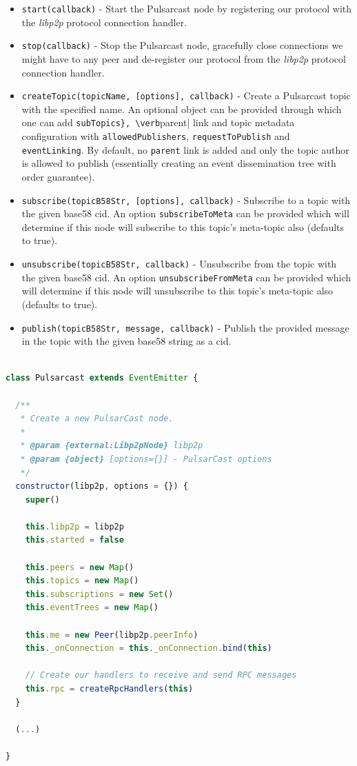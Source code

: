 \begin{itemize}
  \item
    \verb|start(callback)| -  Start the Pulsarcast node by registering our protocol with the \emph{libp2p} protocol connection handler.
  \item
    \verb|stop(callback)| - Stop the Pulsarcast node, gracefully close connections we might have to any peer and de-register our protocol from the \emph{libp2p} protocol connection handler.
  \item
  \verb|createTopic(topicName, [options], callback)| - Create a Pulsarcast topic with the specified name. An optional object can be provided through which one can add \verb|subTopics}, \verb|parent| link and topic metadata configuration with \verb|allowedPublishers|, \verb|requestToPublish| and \verb|eventLinking|. By default, no \verb|parent| link is added and only the topic author is allowed to publish (essentially creating an event dissemination tree with order guarantee).
  \item
    \verb|subscribe(topicB58Str, [options], callback)| - Subscribe to a topic with the given base58 \acrshort{cid}. An option \verb|subscribeToMeta| can be provided which will determine if this node will subscribe to this topic's meta-topic also (defaults to true).
  \item
    \verb|unsubscribe(topicB58Str, callback)| - Unsubscribe from the topic with the given base58 \acrshort{cid}. An option \verb|unsubscribeFromMeta| can be provided which will determine if this node will unsubscribe to this topic's meta-topic also (defaults to true).
  \item
    \verb|publish(topicB58Str, message, callback)| - Publish the provided message in the topic with the given base58 string as a \acrshort{cid}.
\end{itemize}

\begin{lstlisting}[language=JavaScript, float, caption={Pulsarcast constructor},label={pulsarcast-constructor}]

class Pulsarcast extends EventEmitter {

  /**
   * Create a new PulsarCast node.
   *
   * @param {external:Libp2pNode} libp2p
   * @param {object} [options={}] - PulsarCast options
   */
  constructor(libp2p, options = {}) {
    super()

    this.libp2p = libp2p
    this.started = false

    this.peers = new Map()
    this.topics = new Map()
    this.subscriptions = new Set()
    this.eventTrees = new Map()

    this.me = new Peer(libp2p.peerInfo)
    this._onConnection = this._onConnection.bind(this)

    // Create our handlers to receive and send RPC messages
    this.rpc = createRpcHandlers(this)
  }

  (...)

}
\end{lstlisting}

